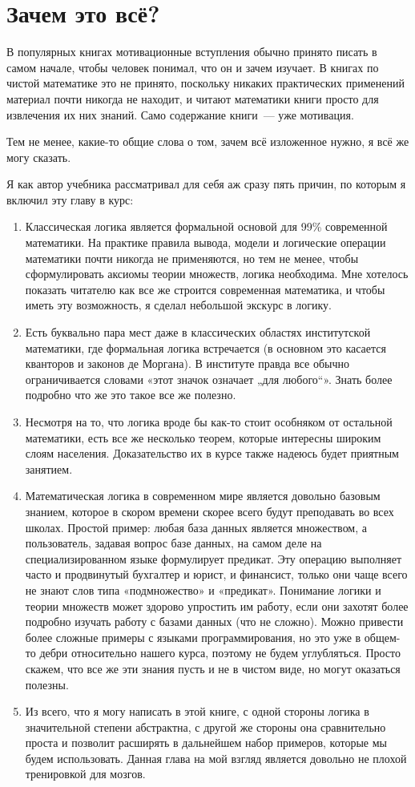 \section{Зачем это всё?}

В популярных книгах мотивационные вступления обычно принято писать в самом начале, чтобы человек понимал, что он и зачем изучает. В книгах по чистой математике это не принято, поскольку никаких практических применений материал почти никогда не находит, и читают математики книги просто для извлечения их них знаний. Само содержание книги~--- уже мотивация.

Тем не менее, какие-то общие слова о том, зачем всё изложенное нужно, я всё же могу сказать.

Я как автор учебника рассматривал для себя аж сразу пять причин, по которым я включил эту главу в курс:

\begin{enumerate}
\item Классическая логика является формальной основой для 99\% современной математики. На практике правила вывода, модели и логические операции математики почти никогда не применяются, но тем не менее, чтобы сформулировать аксиомы теории множеств, логика необходима. Мне хотелось показать читателю как все же строится современная математика, и чтобы иметь эту возможность, я сделал небольшой экскурс в логику.
\item Есть буквально пара мест даже в классических областях институтской математики, где формальная логика встречается (в основном это касается кванторов и законов де Моргана). В институте правда все обычно ограничивается словами «этот значок означает „для любого“». Знать более подробно что же это такое все же полезно.
\item Несмотря на то, что логика вроде бы как-то стоит особняком от остальной математики, есть все же несколько теорем, которые интересны широким слоям населения. Доказательство их в курсе также надеюсь будет приятным занятием.
\item Математическая логика в современном мире является довольно базовым знанием, которое в скором времени скорее всего будут преподавать во всех школах. Простой пример: любая база данных является множеством, а пользователь, задавая вопрос базе данных, на самом деле на специализированном языке формулирует предикат. Эту операцию выполняет часто и продвинутый бухгалтер и юрист, и финансист, только они чаще всего не знают слов типа «подмножество» и «предикат». Понимание логики и теории множеств может здорово упростить им работу, если они захотят более подробно изучать работу с базами данных (что не сложно). Можно привести более сложные примеры с языками программирования, но это уже в общем-то дебри относительно нашего курса, поэтому не будем углубляться. Просто скажем, что все же эти знания пусть и не в чистом виде, но могут оказаться полезны.
\item Из всего, что я могу написать в этой книге, с одной стороны логика в значительной степени абстрактна, с другой же стороны она сравнительно проста и позволит расширять в дальнейшем набор примеров, которые мы будем использовать. Данная глава на мой взгляд является довольно не плохой тренировкой для мозгов.
\end{enumerate}

